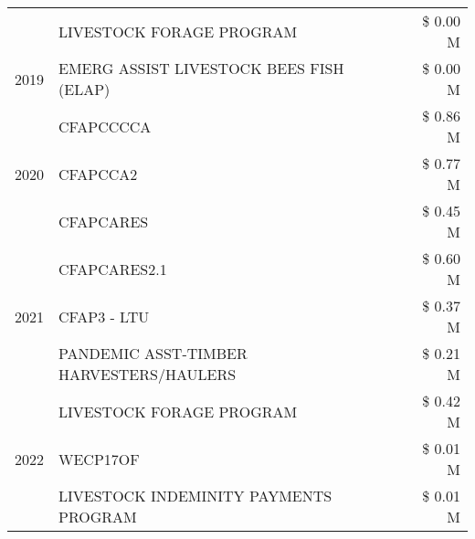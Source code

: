 \begin{tabular}{llr}
 & LIVESTOCK FORAGE PROGRAM & \$ 0.00 M \\
\cline{1-3}
2019 & EMERG ASSIST LIVESTOCK BEES FISH (ELAP) & \$ 0.00 M \\
\cline{1-3}
\multirow[t]{3}{*}{2020} & CFAPCCCCA & \$ 0.86 M \\
 & CFAPCCA2 & \$ 0.77 M \\
 & CFAPCARES & \$ 0.45 M \\
\cline{1-3}
\multirow[t]{3}{*}{2021} & CFAPCARES2.1 & \$ 0.60 M \\
 & CFAP3 - LTU & \$ 0.37 M \\
 & PANDEMIC ASST-TIMBER HARVESTERS/HAULERS & \$ 0.21 M \\
\cline{1-3}
\multirow[t]{3}{*}{2022} & LIVESTOCK FORAGE PROGRAM & \$ 0.42 M \\
 & WECP17OF & \$ 0.01 M \\
 & LIVESTOCK INDEMINITY PAYMENTS PROGRAM & \$ 0.01 M \\
\cline{1-3}
\bottomrule
\end{tabular}
